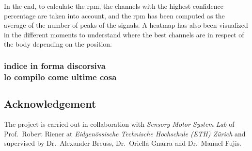  In the end, to calculate the rpm, the channels with the highest confidence percentage are taken into account, and the rpm has been computed as the average of the number of peaks of the signals. A heatmap has also been visualized in the different moments to understand where the best channels are in respect of the body depending on the position. 












\subsubsection*{indice in forma discorsiva \\ lo compilo come ultime cosa}

\subsection*{Acknowledgement}
The project is carried out in collaboration with \textit{Sensory-Motor System Lab} of Prof.~Robert Riener at \textit{Eidgenössische Technische Hochschule 
(ETH) Zürich} and supervised by Dr.~Alexander Breuss, Dr.~Oriella Gnarra and Dr.~Manuel Fujis\cite{ManuelZurich}.




